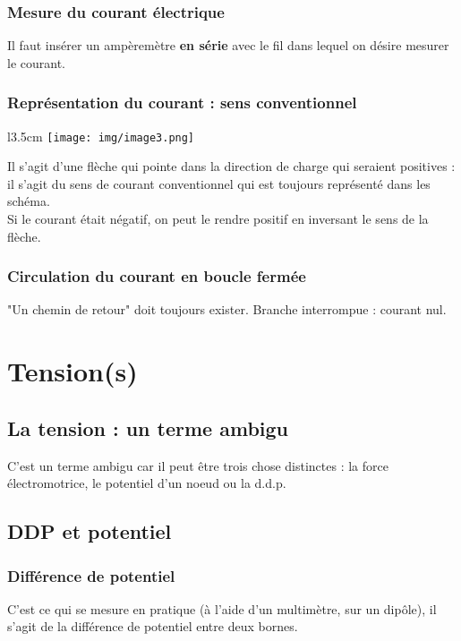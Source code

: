 \documentclass	[11pt, a4paper, openany]{book}
\begin{document}
	\subsubsection{Mesure du courant électrique}
	Il faut insérer un ampèremètre \textbf{en série} avec le fil dans lequel on désire mesurer le courant.
	
	\subsubsection{Représentation du courant : sens conventionnel}
	\begin{wrapfigure}[5]{l}{3.5cm}
		\texttt{[image: img/image3.png]}
	\end{wrapfigure}
	Il s'agit d'une flèche qui pointe dans la direction de charge qui seraient positives : il s'agit du sens de courant conventionnel qui est toujours représenté dans les schéma.\\
	Si le courant était négatif, on peut le rendre positif en inversant le sens de la flèche.
	
	\subsubsection{Circulation du courant en boucle fermée}
	"Un chemin de retour" doit toujours exister. Branche interrompue : courant nul.
	
	\section{Tension(s)}
	\subsection{La tension : un terme ambigu}
	C'est un terme ambigu car il peut être trois chose distinctes : la force électromotrice, le potentiel d'un noeud ou la d.d.p.
	
	\subsection{DDP et potentiel}
	\subsubsection{Différence de potentiel}
	C'est ce qui se mesure en pratique (à l'aide d'un multimètre, sur un dipôle), il s'agit de la différence de potentiel entre deux bornes.
	
\end{document}

